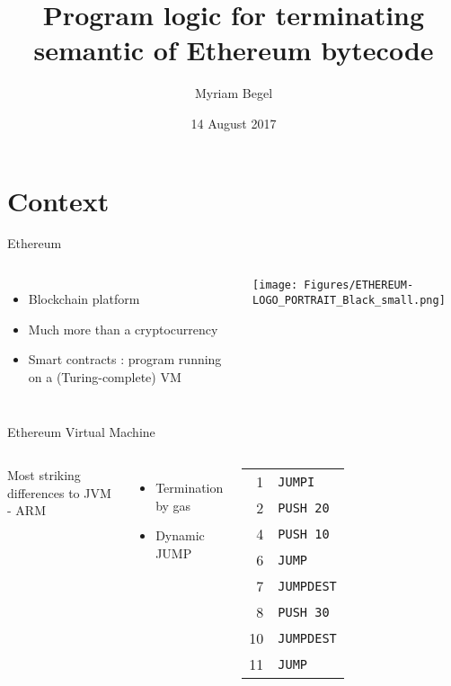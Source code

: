 \documentclass{beamer}
\title{Program logic for terminating semantic of Ethereum bytecode}
\author{Myriam Begel}
\date{14 August 2017}
\begin{document}
\maketitle


\part{Context}
\frame[plain]{\partpage}

\begin{frame}{Ethereum}
	\begin{columns}[c]
		\begin{itemize}
			\item Blockchain platform
			\item Much more than a cryptocurrency
			\item Smart contracts : program running on a (Turing-complete) VM
		\end{itemize}
		\texttt{[image: Figures/ETHEREUM-LOGO\_PORTRAIT\_Black\_small.png]}
	\end{columns}
\end{frame}

\begin{frame}{Ethereum Virtual Machine \footnotesize{\cite{wood2014ethereum}}}
	\begin{columns}[c]
		Most striking differences to JVM - ARM
		\begin{itemize}
			\item Termination by gas
			\item Dynamic JUMP
		\end{itemize}
		\begin{tabular}{r l}
			1 & \texttt{JUMPI} \\
			2 & \texttt{PUSH~20}\\
			4 & \texttt{PUSH~10}\\
			6 & \texttt{JUMP}\\
			7 & \texttt{JUMPDEST}\\
			8 & \texttt{PUSH~30}\\
			10 & \texttt{JUMPDEST}\\
			11 & \texttt{JUMP}
		\end{tabular}
	\end{columns}
\end{frame}
\end{document}
